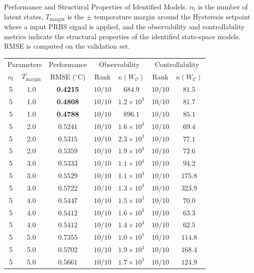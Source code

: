 
\caption{Performance and Structural Properties of Identified Models. $n_l$ is the number of latent states, $T_{\mathrm{margin}}$ is the $\pm$ temperature margin around the Hysteresis setpoint where a input PRBS signal is applied, and the observability and controllability metrics indicate the structural properties of the identified state-space models. RMSE is computed on the validation set.}
\label{tab:model_analysis}
\begin{tabular}{cc c cc cc}
\toprule
\multicolumn{2}{c}{Parameters} & \multicolumn{1}{c}{Performance} & \multicolumn{2}{c}{Observability} & \multicolumn{2}{c}{Controllability} \\
\cmidrule(lr){1-2} \cmidrule(lr){3-3} \cmidrule(lr){4-5} \cmidrule(lr){6-7}
$n_l$ & $T_{\mathrm{margin}}$ & RMSE ($^\circ$C) & Rank & $\kappa(W_{\mathcal{O}})$ & Rank & $\kappa(W_{\mathcal{C}})$ \\
\midrule
5 & 1.0 & \textbf{0.4215} & $10/10$ & $684.9$ & $10/10$ & $81.5$ \\
5 & 1.0 & \textbf{0.4808} & $10/10$ & $1.2 \times 10^{3}$ & $10/10$ & $81.7$ \\
5 & 1.0 & \textbf{0.4788} & $10/10$ & $896.1$ & $10/10$ & $85.1$ \\
5 & 2.0 & $0.5241$ & $10/10$ & $1.6 \times 10^{3}$ & $10/10$ & $69.4$ \\
5 & 2.0 & $0.5315$ & $10/10$ & $2.3 \times 10^{3}$ & $10/10$ & $77.1$ \\
5 & 2.0 & $0.5359$ & $10/10$ & $1.9 \times 10^{3}$ & $10/10$ & $72.6$ \\
5 & 3.0 & $0.5333$ & $10/10$ & $1.1 \times 10^{3}$ & $10/10$ & $94.2$ \\
5 & 3.0 & $0.5529$ & $10/10$ & $1.1 \times 10^{3}$ & $10/10$ & $175.8$ \\
5 & 3.0 & $0.5722$ & $10/10$ & $1.3 \times 10^{3}$ & $10/10$ & $323.9$ \\
5 & 4.0 & $0.5447$ & $10/10$ & $1.5 \times 10^{3}$ & $10/10$ & $70.0$ \\
5 & 4.0 & $0.5412$ & $10/10$ & $1.6 \times 10^{3}$ & $10/10$ & $63.3$ \\
5 & 4.0 & $0.5412$ & $10/10$ & $1.4 \times 10^{3}$ & $10/10$ & $62.5$ \\
5 & 5.0 & $0.7355$ & $10/10$ & $1.0 \times 10^{7}$ & $10/10$ & $114.8$ \\
5 & 5.0 & $0.5702$ & $10/10$ & $1.9 \times 10^{3}$ & $10/10$ & $168.4$ \\
5 & 5.0 & $0.5661$ & $10/10$ & $1.7 \times 10^{3}$ & $10/10$ & $124.9$ \\
\bottomrule
\end{tabular}
